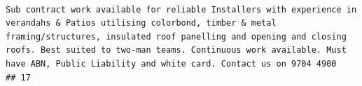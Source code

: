 \documentclass[11pt,a4paper,]{article}
\begin{document}
\begin{verbatim}
                                                                                                                                                                                                                                                                                                                                                                                     Sub contract work available for reliable Installers with experience in verandahs & Patios utilising colorbond, timber & metal framing/structures, insulated roof panelling and opening and closing roofs. Best suited to two-man teams. Continuous work available. Must have ABN, Public Liability and white card. Contact us on 9704 4900
## 17                                                                                                                                                                                                                                                                                                                                                                                                                                                                                                                                                                                                                                                                                                                                                                                                                                                                                                                                                                                                                                                                                                                                                                                                                                                                                                                                                                                                                                                                                                                                                                                                                                                                                                                                                                                                                                                                                                                                                                                                                                                                                                                                                                                                                                                                                                                                                                                                                                                                                                                                                                                                                                                                                                                  
\end{verbatim}
\end{document}

